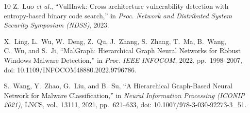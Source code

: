\documentclass[conference]{IEEEtran}
\begin{document}
\begin{thebibliography}{10}
Z.~Luo \textit{et al.}, ``{VulHawk}: Cross-architecture vulnerability
detection with entropy-based binary code search,''
in {\em Proc. Network and Distributed System Security Symposium (NDSS)}, 2023.

X.~Ling, L.~Wu, W.~Deng, Z.~Qu, J.~Zhang, S.~Zhang, T.~Ma, B.~Wang, C.~Wu, and S.~Ji,
``{MalGraph}: Hierarchical Graph Neural Networks for Robust {Windows} Malware Detection,''
in \emph{Proc. IEEE INFOCOM}, 2022, pp.~1998--2007,
doi: 10.1109/INFOCOM48880.2022.9796786.

S.~Wang, Y.~Zhao, G.~Liu, and B.~Su,
``A Hierarchical Graph-Based Neural Network for Malware Classification,''
in \emph{Neural Information Processing (ICONIP 2021)},
LNCS, vol.~13111, 2021, pp.~621--633,
doi: 10.1007/978-3-030-92273-3\_51.

\end{thebibliography}
\end{document}

